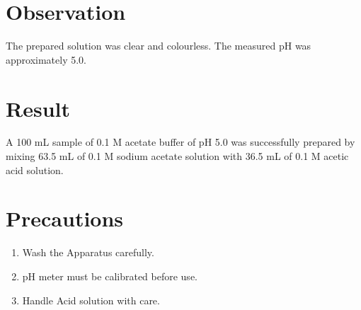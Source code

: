 \documentclass[12pt]{article}
\begin{document}
	\section*{Observation}
	
	The prepared solution was clear and colourless. The measured pH was approximately 5.0.
	
	\section*{Result}
	
	A 100 mL sample of 0.1 M acetate buffer of pH 5.0 was successfully prepared by mixing 63.5 mL of 0.1 M sodium acetate solution with 36.5 mL of 0.1 M acetic acid solution.
	
	\section*{Precautions}
	
	\begin{enumerate}
		\item Wash the Apparatus carefully.
		\item pH meter must be calibrated before use.
		\item Handle Acid solution with care.
\end{enumerate}

	
\end{document}

